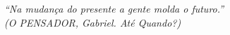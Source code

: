 \begin{epigrafe}
    \vspace*{\fill}
    \begin{flushright}
        \textit{``Na mudança do presente a gente molda o futuro.''\\
        (O PENSADOR, Gabriel. Até Quando?)}
    \end{flushright}
\end{epigrafe}
